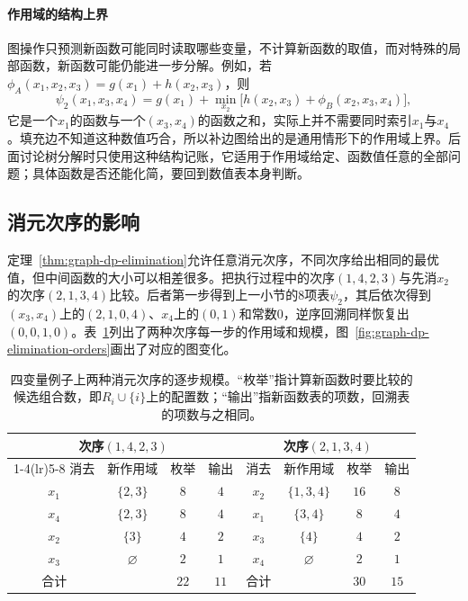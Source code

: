 \paragraph{作用域的结构上界}
图操作只预测新函数可能同时读取哪些变量，不计算新函数的取值，而对特殊的局部函数，新函数可能仍能进一步分解。例如，若$\phi_A(x_1,x_2,x_3)=g(x_1)+h(x_2,x_3)$，则
\[
\psi_2(x_1,x_3,x_4)=g(x_1)+\min_{x_2}\bigl[h(x_2,x_3)+\phi_B(x_2,x_3,x_4)\bigr],
\]
它是一个$x_1$的函数与一个$(x_3,x_4)$的函数之和，实际上并不需要同时索引$x_1$与$x_4$。填充边不知道这种数值巧合，所以补边图给出的是通用情形下的作用域上界。后面讨论树分解时只使用这种结构记账，它适用于作用域给定、函数值任意的全部问题；具体函数是否还能化简，要回到数值表本身判断。

\subsection{消元次序的影响}
\label{sec:graph-dp-elimination-orders}

定理~\ref{thm:graph-dp-elimination}允许任意消元次序，不同次序给出相同的最优值，但中间函数的大小可以相差很多。把执行过程中的次序$(1,4,2,3)$与先消$x_2$的次序$(2,1,3,4)$比较。后者第一步得到上一小节的$8$项表$\psi_2$，其后依次得到$(x_3,x_4)$上的$(2,1,0,4)$、$x_4$上的$(0,1)$和常数$0$，逆序回溯同样恢复出$(0,0,1,0)$。表~\ref{tab:graph-dp-elimination-orders}列出了两种次序每一步的作用域和规模，图~\ref{fig:graph-dp-elimination-orders}画出了对应的图变化。

\begin{table}[!htb]
  \centering
  \caption{四变量例子上两种消元次序的逐步规模。“枚举”指计算新函数时要比较的候选组合数，即$R_i\cup\{i\}$上的配置数；“输出”指新函数表的项数，回溯表的项数与之相同。}
  \label{tab:graph-dp-elimination-orders}
  \begin{tabular}{cccccccc}
    \toprule
    \multicolumn{4}{c}{次序$(1,4,2,3)$} & \multicolumn{4}{c}{次序$(2,1,3,4)$}\\
    \cmidrule(lr){1-4}\cmidrule(lr){5-8}
    消去 & 新作用域 & 枚举 & 输出 & 消去 & 新作用域 & 枚举 & 输出\\
    \midrule
    $x_1$ & $\{2,3\}$ & $8$ & $4$ & $x_2$ & $\{1,3,4\}$ & $16$ & $8$\\
    $x_4$ & $\{2,3\}$ & $8$ & $4$ & $x_1$ & $\{3,4\}$ & $8$ & $4$\\
    $x_2$ & $\{3\}$ & $4$ & $2$ & $x_3$ & $\{4\}$ & $4$ & $2$\\
    $x_3$ & $\varnothing$ & $2$ & $1$ & $x_4$ & $\varnothing$ & $2$ & $1$\\
    \midrule
    合计 & & $22$ & $11$ & 合计 & & $30$ & $15$\\
    \bottomrule
  \end{tabular}
\end{table}

